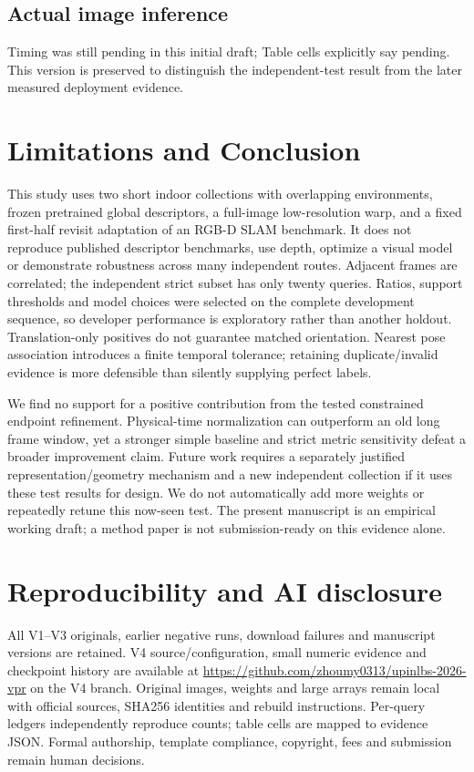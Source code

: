\documentclass[conference,letterpaper]{IEEEtran}
\begin{document}
\subsection{Actual image inference}
Timing was still pending in this initial draft; Table cells explicitly say pending. This version is preserved to distinguish the independent-test result from the later measured deployment evidence.

\section{Limitations and Conclusion}
This study uses two short indoor collections with overlapping environments, frozen pretrained global descriptors, a full-image low-resolution warp, and a fixed first-half revisit adaptation of an RGB-D SLAM benchmark. It does not reproduce published descriptor benchmarks, use depth, optimize a visual model or demonstrate robustness across many independent routes. Adjacent frames are correlated; the independent strict subset has only twenty queries. Ratios, support thresholds and model choices were selected on the complete development sequence, so developer performance is exploratory rather than another holdout. Translation-only positives do not guarantee matched orientation. Nearest pose association introduces a finite temporal tolerance; retaining duplicate/invalid evidence is more defensible than silently supplying perfect labels.

We find no support for a positive contribution from the tested constrained endpoint refinement. Physical-time normalization can outperform an old long frame window, yet a stronger simple baseline and strict metric sensitivity defeat a broader improvement claim. Future work requires a separately justified representation/geometry mechanism and a new independent collection if it uses these test results for design. We do not automatically add more weights or repeatedly retune this now-seen test. The present manuscript is an empirical working draft; a method paper is not submission-ready on this evidence alone.

\section*{Reproducibility and AI disclosure}
All V1--V3 originals, earlier negative runs, download failures and manuscript versions are retained. V4 source/configuration, small numeric evidence and checkpoint history are available at \url{https://github.com/zhoumy0313/upinlbs-2026-vpr} on the V4 branch. Original images, weights and large arrays remain local with official sources, SHA256 identities and rebuild instructions. Per-query ledgers independently reproduce counts; table cells are mapped to evidence JSON. Formal authorship, template compliance, copyright, fees and submission remain human decisions.
\end{document}
